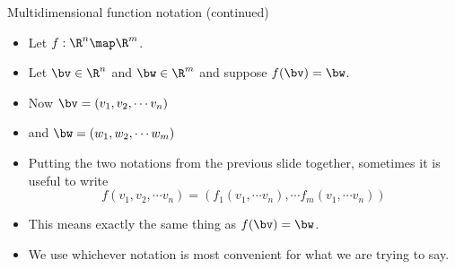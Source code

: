 \documentclass{beamer}
\begin{document}
\begin{frame}{Multidimensional function notation (continued)}

\begin{itemize}
\item Let $f:\R^n \map \R^m$.
\item Let $\bv \in \R^n$ and $\bw \in \R^m$ and suppose $f(\bv) = \bw$.
\item Now $\bv = (v_1, v_2, \cdots v_n)$
\item and $\bw = (w_1, w_2, \cdots w_m)$
\item Putting the two notations from the previous slide together, sometimes it
is useful to write
$$f(v_1, v_2, \cdots v_n) = (f_1(v_1,\cdots v_n), \cdots f_m(v_1,\cdots v_n))$$
\item This means exactly the same thing as $f(\bv) = \bw$.
\item We use whichever notation is most convenient for what we are trying to say.
\end{itemize}

\end{frame}
\end{document}

